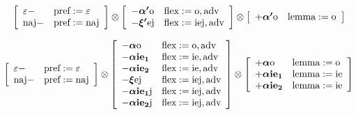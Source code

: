 \documentclass{article}
\begin{document}
\begin{scriptsize}\[
\left[\begin{array}{ll}
\varepsilon- & \text{pref}:=\text{$\varepsilon$}\\
\text{naj}- & \text{pref}:=\text{naj}
\end{array}\right] \otimes \left[\begin{array}{ll}
-\text{\boldmath$\alpha'$o} & \text{flex}:=\text{o}, \text{adv}\\
-\text{\boldmath$\xi'$ej} & \text{flex}:=\text{iej}, \text{adv}
\end{array}\right] \otimes \left[\begin{array}{ll}
+\text{\boldmath$\alpha'$o} & \text{lemma}:=\text{o}
\end{array}\right]
\]\end{scriptsize}

\begin{scriptsize}\[
\left[\begin{array}{ll}
\varepsilon- & \text{pref}:=\text{$\varepsilon$}\\
\text{naj}- & \text{pref}:=\text{naj}
\end{array}\right] \otimes \left[\begin{array}{ll}
-\text{\boldmath$\alpha$o} & \text{flex}:=\text{o}, \text{adv}\\
-\text{\boldmath$\alpha${\bf ie}$_1$} & \text{flex}:=\text{ie}, \text{adv}\\
-\text{\boldmath$\alpha${\bf ie}$_2$} & \text{flex}:=\text{ie}, \text{adv}\\
-\text{\boldmath$\xi$ej} & \text{flex}:=\text{iej}, \text{adv}\\
-\text{\boldmath$\alpha${\bf ie}$_1$j} & \text{flex}:=\text{iej}, \text{adv}\\
-\text{\boldmath$\alpha${\bf ie}$_2$j} & \text{flex}:=\text{iej}, \text{adv}
\end{array}\right] \otimes \left[\begin{array}{ll}
+\text{\boldmath$\alpha$o} & \text{lemma}:=\text{o}\\
+\text{\boldmath$\alpha${\bf ie}$_1$} & \text{lemma}:=\text{ie}\\
+\text{\boldmath$\alpha${\bf ie}$_2$} & \text{lemma}:=\text{ie}
\end{array}\right]
\]\end{scriptsize}
\end{document}
